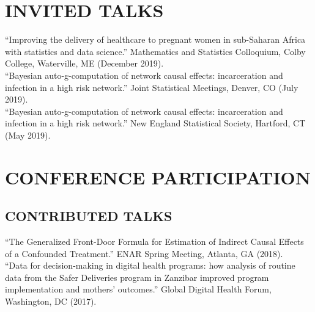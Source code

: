 \documentclass[12pt]{article}
\begin{document}

\section*{\textbf{{\large I}{NVITED} {\large T}{ALKS}}}   


``Improving the delivery of healthcare to pregnant women in sub-Saharan Africa with statistics and data science.'' Mathematics and Statistics Colloquium, Colby College, Waterville, ME (December 2019). \\ 

``Bayesian auto-g-computation of network causal effects: incarceration and infection in a high risk network.'' Joint Statistical Meetings, Denver, CO (July 2019). \\

``Bayesian auto-g-computation of network causal effects: incarceration and infection in a high risk network.'' New England Statistical Society, Hartford, CT (May 2019). 

\section*{\textbf{{\large C}{ONFERENCE} {\large P}{ARTICIPATION}}}  

\subsection*{\textbf{CONTRIBUTED TALKS}}

``The Generalized Front-Door Formula for Estimation of Indirect Causal Effects of a Confounded Treatment.'' ENAR Spring Meeting, Atlanta, GA (2018). \\

``Data for decision-making in digital health programs: how analysis of routine data from the Safer Deliveries program in Zanzibar improved program implementation and mothers' outcomes.'' Global Digital Health Forum, Washington, DC (2017). \\
\end{document}
